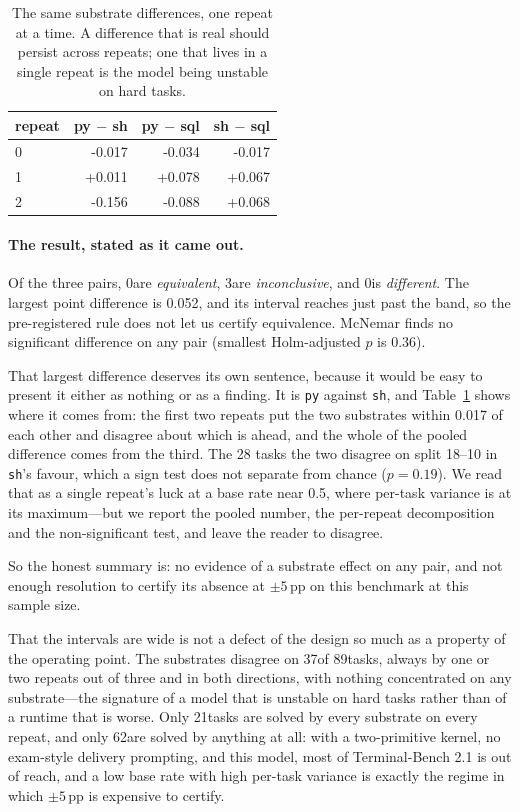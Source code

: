 \documentclass[11pt,a4paper]{article}
\begin{document}
\begin{table}[h]\centering\small
\caption{The same substrate differences, one repeat at a time. A difference
that is real should persist across repeats; one that lives in a single repeat
is the model being unstable on hard tasks.}
\label{tab:tbperrep}
\begin{tabular}{lrrr}
\toprule
repeat & py $-$ sh & py $-$ sql & sh $-$ sql \\
\midrule
0 & -0.017 & -0.034 & -0.017 \\
1 & +0.011 & +0.078 & +0.067 \\
2 & -0.156 & -0.088 & +0.068 \\
\bottomrule
\end{tabular}
\end{table}

\paragraph{The result, stated as it came out.}
Of the three pairs, 0are \emph{equivalent}, 3are
\emph{inconclusive}, and 0is \emph{different}. The largest point
difference is 0.052, and its interval reaches just past the band, so the
pre-registered rule does not let us certify equivalence. McNemar finds no
significant difference on any pair (smallest Holm-adjusted $p$ is 0.36).

That largest difference deserves its own sentence, because it would be easy to
present it either as nothing or as a finding. It is \texttt{py} against
\texttt{sh}, and Table~\ref{tab:tbperrep} shows where it comes from: the first
two repeats put the two substrates within 0.017 of each other and disagree
about which is ahead, and the whole of the pooled difference comes from the
third. The 28 tasks the two disagree on split 18--10 in \texttt{sh}'s favour,
which a sign test does not separate from chance ($p=0.19$). We read that as a single repeat's luck at a base rate near 0.5, where
per-task variance is at its maximum---but we report the pooled number, the
per-repeat decomposition and the non-significant test, and leave the reader to
disagree.

So the honest summary is: no evidence of a substrate effect on any pair, and
not enough resolution to certify its absence at $\pm5$\,pp on this benchmark at
this sample size.

That the intervals are wide is not a defect of the design so much as a
property of the operating point. The substrates disagree on 37of
89tasks, always by one or two repeats out of three and in both
directions, with nothing concentrated on any substrate---the signature of a
model that is unstable on hard tasks rather than of a runtime that is worse.
Only 21tasks are solved by every substrate on every repeat, and only
62are solved by anything at all: with a two-primitive kernel, no
exam-style delivery prompting, and this model, most of Terminal-Bench 2.1 is
out of reach, and a low base rate with high per-task variance is exactly the
regime in which $\pm5$\,pp is expensive to certify.
\end{document}
